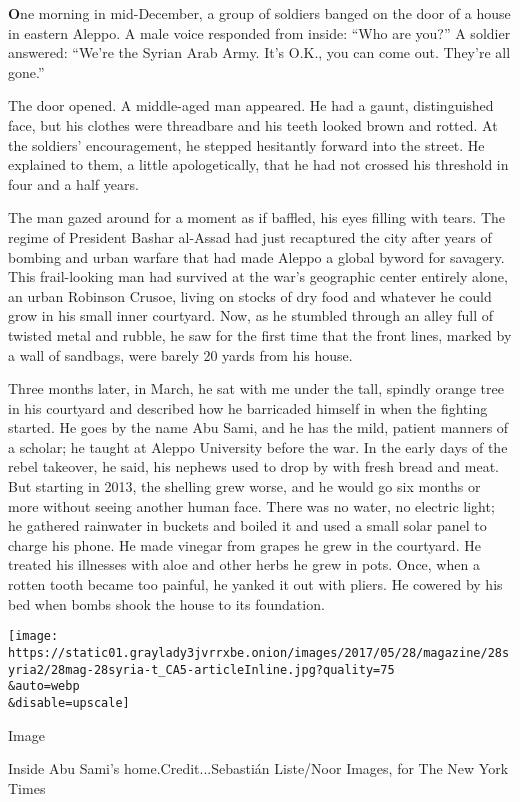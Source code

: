 \textbf{O}ne morning in mid-December, a group of soldiers banged on the
door of a house in eastern Aleppo. A male voice responded from inside:
``Who are you?'' A soldier answered: ``We're the Syrian Arab Army. It's
O.K., you can come out. They're all gone.''

The door opened. A middle-aged man appeared. He had a gaunt,
distinguished face, but his clothes were threadbare and his teeth looked
brown and rotted. At the soldiers' encouragement, he stepped hesitantly
forward into the street. He explained to them, a little apologetically,
that he had not crossed his threshold in four and a half years.

The man gazed around for a moment as if baffled, his eyes filling with
tears. The regime of President Bashar al-Assad had just recaptured the
city after years of bombing and urban warfare that had made Aleppo a
global byword for savagery. This frail-looking man had survived at the
war's geographic center entirely alone, an urban Robinson Crusoe, living
on stocks of dry food and whatever he could grow in his small inner
courtyard. Now, as he stumbled through an alley full of twisted metal
and rubble, he saw for the first time that the front lines, marked by a
wall of sandbags, were barely 20 yards from his house.

Three months later, in March, he sat with me under the tall, spindly
orange tree in his courtyard and described how he barricaded himself in
when the fighting started. He goes by the name Abu Sami, and he has the
mild, patient manners of a scholar; he taught at Aleppo University
before the war. In the early days of the rebel takeover, he said, his
nephews used to drop by with fresh bread and meat. But starting in 2013,
the shelling grew worse, and he would go six months or more without
seeing another human face. There was no water, no electric light; he
gathered rainwater in buckets and boiled it and used a small solar panel
to charge his phone. He made vinegar from grapes he grew in the
courtyard. He treated his illnesses with aloe and other herbs he grew in
pots. Once, when a rotten tooth became too painful, he yanked it out
with pliers. He cowered by his bed when bombs shook the house to its
foundation.

\texttt{[image: https://static01.graylady3jvrrxbe.onion/images/2017/05/28/magazine/28syria2/28mag-28syria-t\_CA5-articleInline.jpg?quality=75\\\&auto=webp\\\&disable=upscale]}

Image

Inside Abu Sami's home.Credit...Sebastián Liste/Noor Images, for The New
York Times

